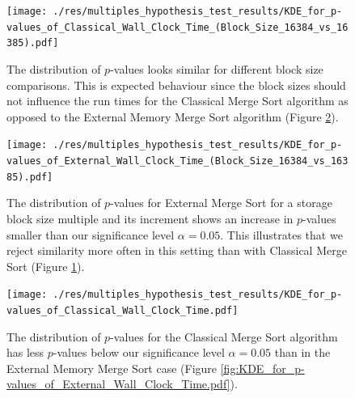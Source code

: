 \documentclass[twocolumn]{article}
\begin{document}
\begin{figure}[htb]
	\begin{minipage}{0.475 \textwidth}
		\centering
		\texttt{[image: ./res/multiples\_hypothesis\_test\_results/KDE\_for\_p-values\_of\_Classical\_Wall\_Clock\_Time\_(Block\_Size\_16384\_vs\_16385).pdf]}
		\caption{The distribution of \( p \)-values looks similar for different block size comparisons. This is expected behaviour since the block sizes should not influence the run times for the Classical Merge
		Sort algorithm as opposed to the External Memory Merge Sort algorithm (Figure \ref{fig:KDE_for_p-values_of_External_Wall_Clock_Time_(Block_Size_16384_vs_16385).pdf}).}
		\label{fig:KDE_for_p-values_of_Classical_Wall_Clock_Time_(Block_Size_16384_vs_16385).pdf}
	\end{minipage}
\end{figure}

\begin{figure}[htb]
	\begin{minipage}{0.475 \textwidth}
	\centering
	\texttt{[image: ./res/multiples\_hypothesis\_test\_results/KDE\_for\_p-values\_of\_External\_Wall\_Clock\_Time\_(Block\_Size\_16384\_vs\_16385).pdf]}
	\caption{The distribution of \( p \)-values for External Merge Sort for a storage block size multiple and its increment shows an increase in \( p \)-values smaller 
	than our significance level \( \alpha = 0.05 \). This illustrates that we reject similarity more often in this setting than with Classical Merge Sort (Figure \ref{fig:KDE_for_p-values_of_Classical_Wall_Clock_Time_(Block_Size_16384_vs_16385).pdf}).}
	\label{fig:KDE_for_p-values_of_External_Wall_Clock_Time_(Block_Size_16384_vs_16385).pdf}
	\end{minipage}
\end{figure}

\begin{figure}[htb]
	\begin{minipage}{0.475 \textwidth}
	\centering
	\texttt{[image: ./res/multiples\_hypothesis\_test\_results/KDE\_for\_p-values\_of\_Classical\_Wall\_Clock\_Time.pdf]}
	\caption{The distribution of \( p \)-values for the Classical Merge Sort algorithm has less \( p \)-values below our significance level \( \alpha = 0.05 \) than in the External Memory Merge Sort case (Figure \ref{fig:KDE_for_p-values_of_External_Wall_Clock_Time.pdf}).}
	\label{fig:KDE_for_p-values_of_Classical_Wall_Clock_Time.pdf}
	\end{minipage}
\end{figure}
\end{document}
